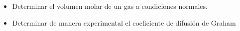 \documentclass[../main.tex]{subfiles}
\begin{document}
\begin{itemize}
    \item 
    Determinar el volumen molar de un gas a condiciones normales.
    \item
    Determinar de manera experimental el coeficiente de difusión de Graham
\end{itemize}
\end{document}

